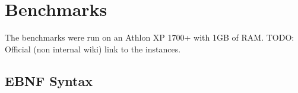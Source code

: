 \documentclass[a4paper,10pt]{article}
\begin{document}
\section{Benchmarks}
The benchmarks were run on an Athlon XP 1700+ with 1GB of RAM.
TODO: Official (non internal wiki) link to the instances.


\appendixname
\begin{appendix}
\section{EBNF Syntax}
\label{appendix}

\end{appendix}



\appendix
\end{document}
